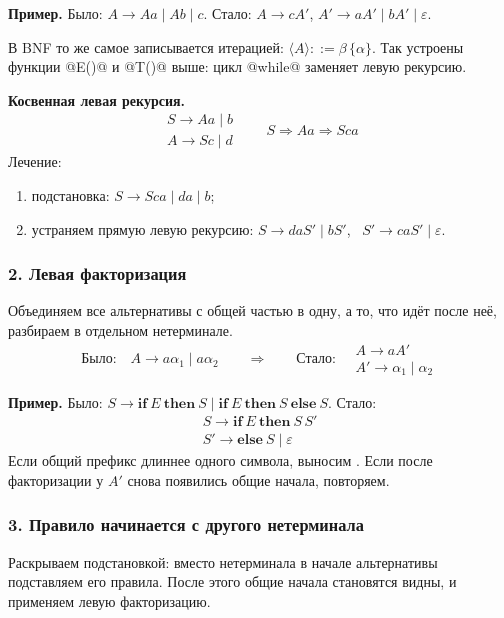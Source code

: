 \documentclass[11pt,a4paper]{article}
\newcommand{\rul}{\rightarrow}
\begin{document}
\textbf{Пример.} Было: $A\rul Aa\mid Ab\mid c$. Стало: $A\rul cA'$, $A'\rul aA'\mid bA'\mid\varepsilon$.

\begin{zam}
В BNF то же самое записывается итерацией: $\langle A\rangle::=\beta\,\{\alpha\}$. Так устроены функции @E()@ и @T()@ выше:
цикл @while@ заменяет левую рекурсию.
\end{zam}

\textbf{Косвенная левая рекурсия.}
\[
\begin{array}{l}S\rul Aa\mid b\\ A\rul Sc\mid d\end{array}
\qquad S\Rightarrow Aa\Rightarrow Sca
\]
Лечение:
\begin{enumerate}
\item подстановка: $S\rul Sca\mid da\mid b$;
\item устраняем прямую левую рекурсию: $S\rul daS'\mid bS'$, \ $S'\rul caS'\mid\varepsilon$.
\end{enumerate}

\subsubsection{2. Левая факторизация}
Объединяем все альтернативы с общей частью в одну, а то, что идёт после неё, разбираем в отдельном нетерминале.
\[
\text{Было:}\quad A\rul a\alpha_1\mid a\alpha_2
\qquad\Longrightarrow\qquad
\text{Стало:}\quad\begin{array}{l}A\rul aA'\\ A'\rul\alpha_1\mid\alpha_2\end{array}
\]

\textbf{Пример.} Было: $S\rul\textbf{if}\ E\ \textbf{then}\ S\mid\textbf{if}\ E\ \textbf{then}\ S\ \textbf{else}\ S$. Стало:
\[
\begin{array}{l}S\rul\textbf{if}\ E\ \textbf{then}\ S\,S'\\ S'\rul\textbf{else}\ S\mid\varepsilon\end{array}
\]
Если общий префикс длиннее одного символа, выносим . Если после факторизации у $A'$ снова появились общие начала, повторяем.

\subsubsection{3. Правило начинается с другого нетерминала}
Раскрываем подстановкой: вместо нетерминала в начале альтернативы подставляем его правила. После этого общие начала становятся видны,
и применяем левую факторизацию.
\end{document}
